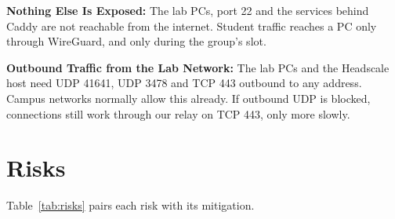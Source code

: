 \documentclass[11pt,a4paper]{article}
\begin{document}
\textbf{Nothing Else Is Exposed:} The lab PCs, port 22 and the services behind
Caddy are not reachable from the internet. Student traffic reaches a PC only
through WireGuard, and only during the group's slot.

\textbf{Outbound Traffic from the Lab Network:} The lab PCs and the Headscale host
need UDP 41641, UDP 3478 and TCP 443 outbound to any address. Campus networks
normally allow this already. If outbound UDP is blocked, connections still work
through our relay on TCP 443, only more slowly.

\section{Risks}

Table~\ref{tab:risks} pairs each risk with its mitigation.
\end{document}
